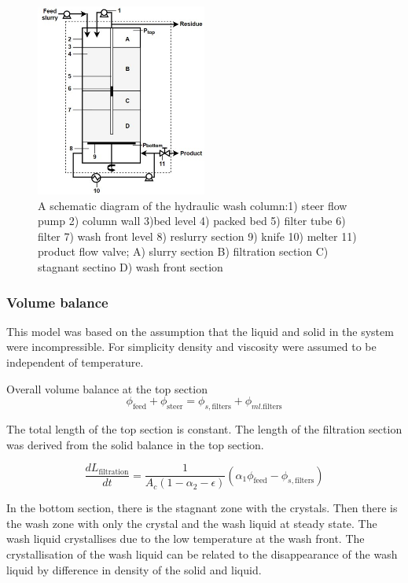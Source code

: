 \begin{figure}
\centering
\includegraphics[width=0.5\textwidth]{figures/hydraulic.jpg}
\caption{A schematic diagram of the hydraulic wash column:1) steer flow pump 2) column wall 3)bed level 4) packed bed 5) filter tube 6) filter 7) wash front level 8) reslurry section 9) knife 10) melter 11) product flow valve; A) slurry section B) filtration section C) stagnant sectino D) wash front section}
\label{fig:myfig}
\end{figure}

\subsubsection{Volume balance} 
This model was based on the assumption that the liquid and solid in the system were incompressible. For simplicity density and viscosity were assumed to be independent of temperature. 

Overall volume balance at the top section 
\begin{equation}
\phi_{\mathrm{feed}}+\phi_{\mathrm{steer}}=\phi_{s,\mathrm{filters}}+\phi_{ml.\mathrm{filters}}
\end{equation}

The total length of the top section is constant. The length of the filtration section was derived from the solid balance in the top section. 

\begin{equation}
\frac{dL_{\mathrm{filtration}}}{dt} = \frac{1}{A_c(1-\alpha_2-\epsilon)}(\alpha_1\phi_{\mathrm{feed}}-\phi_{s,\mathrm{filters}})
\end{equation}

In the bottom section, there is the stagnant zone with the crystals. Then there is the wash zone with only the crystal and the wash liquid at steady state. The wash liquid crystallises due to the low temperature at the wash front. The crystallisation of the wash liquid can be related to the disappearance of the wash liquid by difference in density of the solid and liquid.

